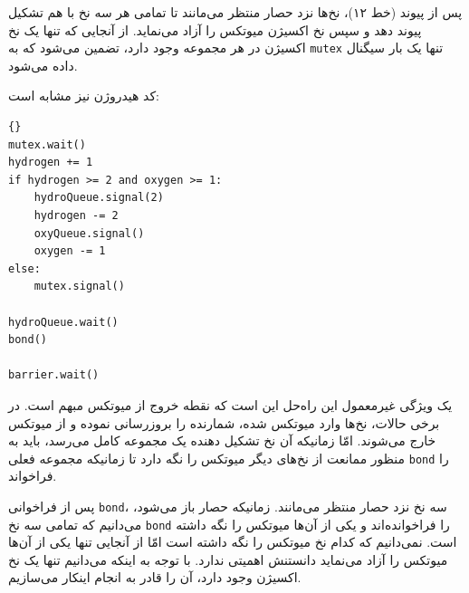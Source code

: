 \documentclass{book}
\begin{document}
    پس از پیوند (خط ۱۲)، نخ‌ها نزد حصار منتظر می‌مانند تا تمامی هر سه نخ با هم تشکیل پیوند دهد و سپس نخ اکسیژن میوتکس را آزاد می‌نماید. 
    از آنجایی که تنها یک نخ اکسیژن در هر مجموعه وجود دارد، تضمین می‌شود که به  {\tt mutex} تنها یک بار سیگنال داده می‌شود. 

    کد هیدروژن نیز مشابه است: 

\begin{latin}
\begin{lstlisting}[title=\rl{کد هیدروژن}]{}
mutex.wait()
hydrogen += 1
if hydrogen >= 2 and oxygen >= 1:
    hydroQueue.signal(2)
    hydrogen -= 2
    oxyQueue.signal()
    oxygen -= 1
else:
    mutex.signal()

hydroQueue.wait()
bond()

barrier.wait()
\end{lstlisting}
\end{latin}

    یک ویژگی غیرمعمول این راه‌حل این است که نقطه خروج از میوتکس مبهم است. در برخی حالات، نخ‌ها وارد میوتکس شده، شمارنده را 
    بروزرسانی نموده و از میوتکس خارج می‌شوند. امّا زمانیکه آن نخ تشکیل دهنده یک مجموعه کامل می‌رسد، باید به منظور ممانعت از نخ‌های دیگر 
    میوتکس را نگه دارد تا زمانیکه مجموعه فعلی {\tt bond} را فراخواند. 

    پس از فراخوانی {\tt bond}، سه نخ نزد حصار منتظر می‌مانند. زمانیکه حصار باز می‌شود، می‌دانیم که تمامی سه نخ {\tt bond} را فراخوانده‌اند و 
    یکی از آن‌ها میوتکس را نگه داشته است. نمی‌دانیم که  کدام نخ میوتکس را نگه داشته است امّا 
    از آنجایی تنها یکی از آن‌ها میوتکس را آزاد می‌نماید دانستنش اهمیتی ندارد. با توجه به اینکه می‌دانیم تنها یک نخ اکسیژن وجود دارد، آن را قادر به انجام اینکار 
    می‌سازیم. 
\end{document}
